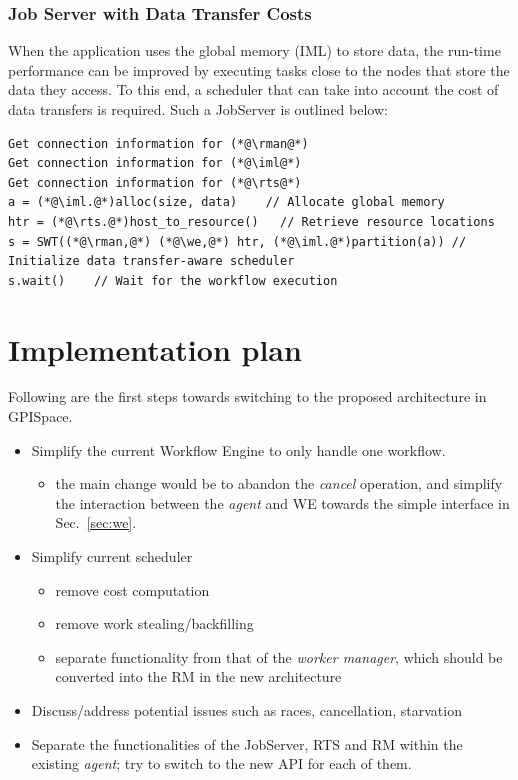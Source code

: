 \documentclass[10pt]{article}
\newcommand{\rts}{RTS\xspace}
\newcommand{\rman}{RM\xspace}
\newcommand{\iml}{IML\xspace}
\newcommand{\we}{WE\xspace}
\begin{document}
\subsubsection{Job Server with Data Transfer Costs}
When the application uses the global memory (\iml) to store data, the run-time
performance can be improved by executing tasks close to the nodes that store the
data they access. To this end, a scheduler that can take into account the cost
of data transfers is required.
Such a JobServer is outlined below:
\begin{lstlisting}
Get connection information for (*@\rman@*)
Get connection information for (*@\iml@*)
Get connection information for (*@\rts@*)
a = (*@\iml.@*)alloc(size, data)    // Allocate global memory
htr = (*@\rts.@*)host_to_resource()   // Retrieve resource locations 
s = SWT((*@\rman,@*) (*@\we,@*) htr, (*@\iml.@*)partition(a)) // Initialize data transfer-aware scheduler
s.wait()    // Wait for the workflow execution
\end{lstlisting}


\section{Implementation plan}

Following are the first steps towards switching to the proposed architecture in
GPISpace.

\begin{itemize}
    \item Simplify the current Workflow Engine to only handle one workflow.
    \begin{itemize}
        \item the main change would be to abandon the \emph{cancel} operation,
        and simplify the interaction between the \emph{agent} and \we towards the simple
        interface in Sec.~\ref{sec:we}.
    \end{itemize}
    \item Simplify current scheduler
    \begin{itemize}
        \item remove cost computation
        \item remove work stealing/backfilling 
        \item separate functionality from that of the \emph{worker manager},
        which should be converted into the \rman in the new architecture
    \end{itemize}     
    
    \item Discuss/address potential issues such as races, cancellation, 
    starvation
    
    \item Separate the functionalities of the JobServer, \rts and \rman within
    the existing \emph{agent}; try to switch to the new API for each of them.
\end{itemize}
\end{document}
